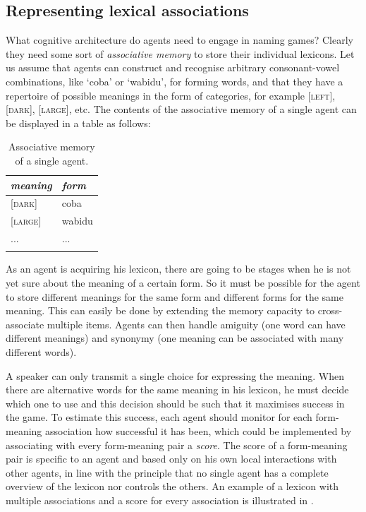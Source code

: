 \subsection{Representing lexical associations}

What cognitive architecture do agents need to engage in naming 
games? Clearly they need some sort of {\itshape associative memory} to
store their individual lexicons.
Let us assume that agents 
can construct and recognise arbitrary consonant-vowel combinations, 
like `coba' or `wabidu', for forming words, and that they 
have a repertoire of possible meanings in the form of 
categories, for example [\textsc{left}], [\textsc{dark}], [\textsc{large}], etc. 
The contents of the associative memory of a single agent can
be displayed in a table as follows: 

\begin{table}
\begin{center}
\begin{tabular}{ l  l }
\lsptoprule
{\itshape meaning} & {\itshape form} \\ 
\midrule{}
{}[\textsc{dark}] & coba \\ 
{}[\textsc{large}] & wabidu \\ 
... & ... \\ 
\lspbottomrule
\end{tabular}
\end{center}
\caption{\label{tab:t-mem}Associative memory of a single agent.}
\end{table}
As an agent is acquiring his lexicon, there are going to 
be stages when he is not yet sure about the meaning of 
a certain form. So it must be possible for the agent
to store different 
meanings for the same form and different forms for the
same meaning. This can easily be done by extending the memory capacity
to cross-associate multiple items. Agents can then 
handle amiguity (one word can have different
meanings) and synonymy (one meaning can 
be associated with many different words). 

A speaker can only transmit a single choice for 
expressing the meaning.
When there are alternative words for the same meaning in 
his lexicon, he must decide which one to use and this decision
should be such that it maximises success in the game. 
To estimate this success, 
each agent should monitor for each form-meaning association
how successful it has been, which could be implemented 
by associating with every form-meaning pair 
a {\itshape score}. The score of a form-meaning pair
is specific to an agent and based only on his own 
local interactions with other agents, in line with the 
principle that no single agent has a complete overview of 
the lexicon nor controls the others. An example of 
a lexicon with multiple associations and a score for every 
association is illustrated in . 

